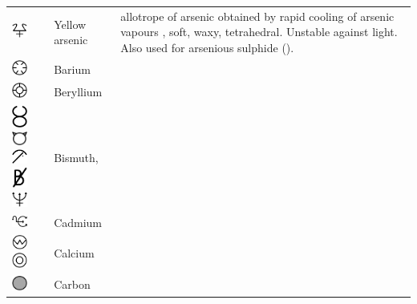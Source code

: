 \documentclass[british,final,landscape]{scrartcl}
\begin{document}
\begin{refsection}
\begin{supertabular}{p{0.3\textwidth}p{0.34\textwidth}p{0.34\textwidth}}
  \includegraphics[width=5mm]{Elements/YellowArsenic} & Yellow arsenic &  allotrope of arsenic obtained by rapid cooling of arsenic vapours , soft, waxy, tetrahedral. Unstable against light. Also used for arsenious sulphide ().\\
  \includegraphics[width=5mm]{Elements/Barium} & Barium & \\
  \includegraphics[width=5mm]{Elements/Beryllium} & Beryllium & \\
  \includegraphics[width=5mm]{Elements/Bismuth1} \includegraphics[width=5mm]{Elements/Bismuth2} \includegraphics[width=5mm]{Elements/Bismuth3} \includegraphics[width=5mm]{Elements/Bismuth4}
  \includegraphics[width=5mm]{Astrology/Neptun} & Bismuth,  & \\
  \includegraphics[width=5mm]{Elements/Cadmium} & Cadmium & \\
  \includegraphics[width=5mm]{Elements/Calcium} \includegraphics[width=5mm]{Elements/Calcium2} & Calcium & \\
  \includegraphics[width=5mm]{Elements/Kohlenstoff} & Carbon & \\

\end{supertabular}
\end{refsection}
\end{document}
